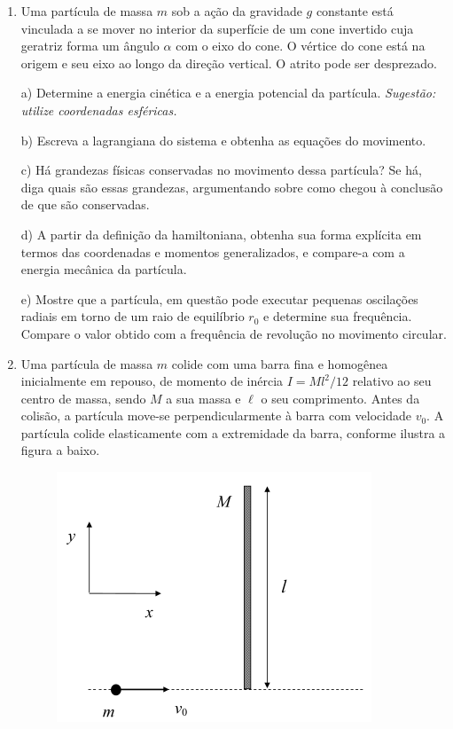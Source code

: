 \begin{enumerate}[start=1,label={\bfseries Q\arabic*.}]
\item Uma partícula de massa $m$ sob a ação da gravidade $g$ constante está vinculada a se mover no interior da superfície de um cone invertido cuja geratriz forma um ângulo $\alpha$ com o eixo do cone. O vértice do cone está na origem e seu eixo ao longo da direção vertical. O atrito pode ser desprezado.

a) Determine a energia cinética e a energia potencial da partícula. \textit{Sugestão: utilize coordenadas esféricas.}

\resposta

b) Escreva a lagrangiana do sistema e obtenha as equações do movimento.

\resposta

c) Há grandezas físicas conservadas no movimento dessa partícula? Se há, diga quais são essas grandezas, argumentando sobre como chegou à conclusão de que são conservadas.

\resposta

d) A partir da definição da hamiltoniana, obtenha sua forma explícita em termos das coordenadas e momentos generalizados, e compare-a com a energia mecânica da partícula.

\resposta

e) Mostre que a partícula, em questão pode executar pequenas oscilações radiais em torno de um raio de equilíbrio $r_{0}$ e determine sua frequência. Compare o valor obtido com a frequência de revolução no movimento circular.

\resposta


\item Uma partícula de massa $m$ colide com uma barra fina e homogênea inicialmente em repouso, de momento de inércia $I = Ml^{2}/12$ relativo ao seu centro de massa, sendo $M$ a sua massa e $\ell$ o seu comprimento. Antes da colisão, a partícula move-se perpendicularmente à barra com velocidade $v_{0}$. A partícula colide elasticamente com a extremidade da barra, conforme ilustra a figura a baixo.
\begin{figure}[H]
\centering
\includegraphics[scale=0.7]{classica-img/colide.png}
\end{figure}


\end{enumerate}
